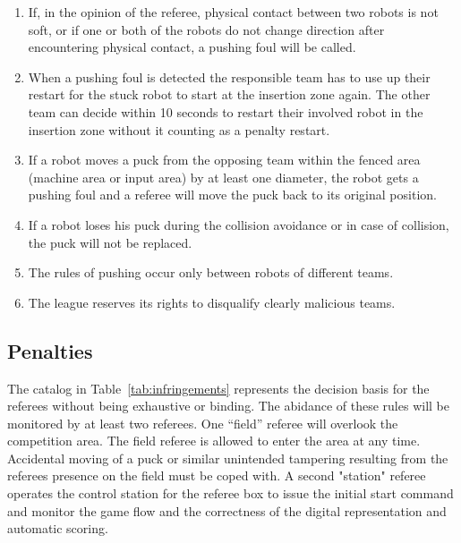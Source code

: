 \documentclass[12pt,twoside]{article}
\begin{document}
\begin{enumerate}
	\item If, in the opinion of the referee, physical contact between two robots is not soft, or if one or both of the robots do not change direction after  encountering physical contact, a pushing foul will be called.
	\item When a pushing foul is detected the responsible team has to use up their restart for the stuck robot to start at the insertion zone again. The other team can decide within 10 seconds to restart their involved robot in the insertion zone without it counting as a penalty restart.
	\item If a robot moves a puck from the opposing team within the fenced area (machine area or input area) by at least one diameter, the robot gets a pushing foul and a referee will move the puck back to its original position.
	\item If a robot loses his puck during the collision avoidance or in case of collision, the puck will not be replaced.
	\item The rules of pushing occur only between robots of different teams.
	\item The league reserves its rights to disqualify clearly malicious teams.
\end{enumerate}


\subsection{Penalties}
The catalog in Table~\ref{tab:infringements} represents the decision
basis for the referees without being exhaustive or binding.
%
The abidance of these rules will be monitored by at least two
referees.  One ``field'' referee will overlook the competition
area. The field referee is allowed to enter the area at any
time. Accidental moving of a puck or similar unintended tampering
resulting from the referees presence on the field must be coped
with. A second "station" referee operates the control station for the
referee box to issue the initial start command and monitor the game
flow and the correctness of the digital representation and automatic
scoring.
\end{document}
